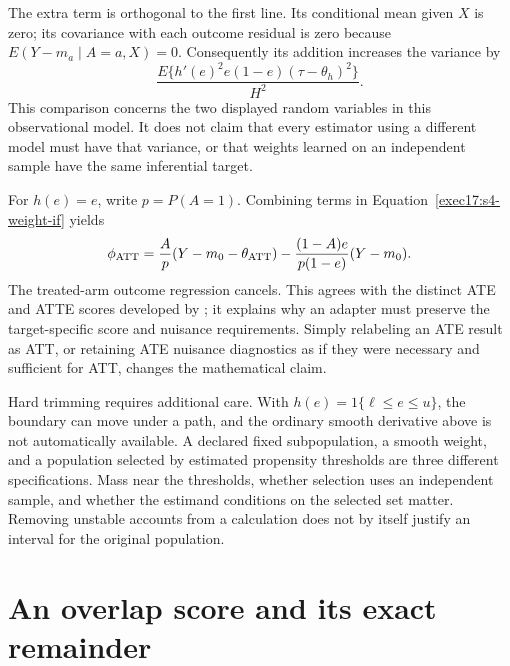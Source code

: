The extra term is orthogonal to the first line. Its conditional mean given
$X$ is zero; its covariance with each outcome residual is zero because
$E(Y-m_a\mid A=a,X)=0$. Consequently its addition increases the variance by
\begin{equation}
 \frac{E\{h'(e)^2e(1-e)(\tau-\theta_h)^2\}}{H^2}.
 \label{exec17:s4-extra-variance}
\end{equation}
This comparison concerns the two displayed random variables in this
observational model. It does not claim that every estimator using a different
model must have that variance, or that weights learned on an independent
sample have the same inferential target.

For $h(e)=e$, write $p=P(A=1)$. Combining terms in
Equation~\eqref{exec17:s4-weight-if} yields
\begin{equation}
 \phi_{\rm ATT}=
 \frac{A}{p}(Y-m_0-\theta_{\rm ATT})
 -\frac{(1-A)e}{p(1-e)}(Y-m_0).
 \label{exec17:s4-att-if}
\end{equation}
The treated-arm outcome regression cancels. This agrees with the distinct
ATE and ATTE scores developed by \citet{dml2018}; it explains why an adapter
must preserve the target-specific score and nuisance requirements. Simply
relabeling an ATE result as ATT, or retaining ATE nuisance diagnostics as if
they were necessary and sufficient for ATT, changes the mathematical claim.

Hard trimming requires additional care. With
$h(e)=1\{\ell\leq e\leq u\}$, the boundary can move under a path, and the
ordinary smooth derivative above is not automatically available. A declared
fixed subpopulation, a smooth weight, and a population selected by estimated
propensity thresholds are three different specifications. Mass near the
thresholds, whether selection uses an independent sample, and whether the
estimand conditions on the selected set matter. Removing unstable accounts
from a calculation does not by itself justify an interval for the original
population.

\section{An overlap score and its exact remainder}
\label{exec17:s4-remainder}

